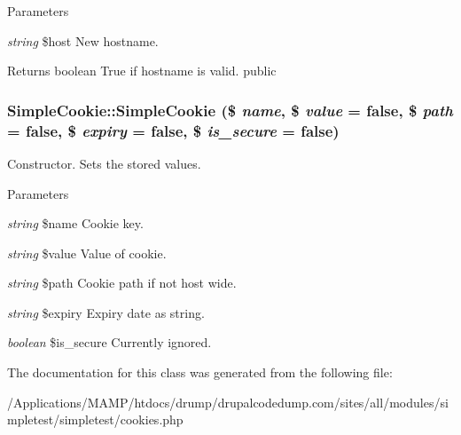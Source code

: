 \begin{DoxyParams}{Parameters}
\item[{\em string}]\$host New hostname. \end{DoxyParams}
\begin{DoxyReturn}{Returns}
boolean True if hostname is valid.  public 
\end{DoxyReturn}
\hypertarget{class_simple_cookie_adc2cfc15b096b46003e927a08d95e35b}{
\subsubsection[{SimpleCookie}]{\setlength{\rightskip}{0pt plus 5cm}SimpleCookie::SimpleCookie (\$ {\em name}, \/  \$ {\em value} = {\ttfamily false}, \/  \$ {\em path} = {\ttfamily false}, \/  \$ {\em expiry} = {\ttfamily false}, \/  \$ {\em is\_\-secure} = {\ttfamily false})}}
\label{class_simple_cookie_adc2cfc15b096b46003e927a08d95e35b}
Constructor. Sets the stored values. 
\begin{DoxyParams}{Parameters}
\item[{\em string}]\$name Cookie key. \item[{\em string}]\$value Value of cookie. \item[{\em string}]\$path Cookie path if not host wide. \item[{\em string}]\$expiry Expiry date as string. \item[{\em boolean}]\$is\_\-secure Currently ignored. \end{DoxyParams}


The documentation for this class was generated from the following file:\begin{DoxyCompactItemize}
\item 
/Applications/MAMP/htdocs/drump/drupalcodedump.com/sites/all/modules/simpletest/simpletest/cookies.php\end{DoxyCompactItemize}

